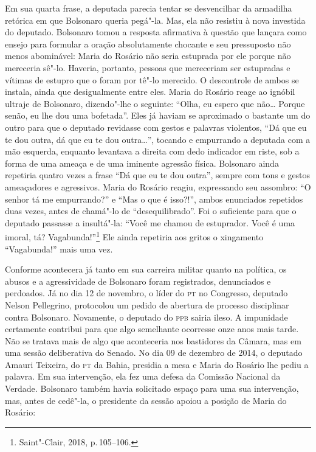 Em sua quarta frase, a deputada parecia tentar se desvencilhar da
armadilha retórica em que Bolsonaro queria pegá"-la. Mas, ela não
resistiu à nova investida do deputado. Bolsonaro tomou a resposta
afirmativa à questão que lançara como ensejo para formular a oração
absolutamente chocante e seu pressuposto não menos abominável: Maria do
Rosário não seria estuprada por ele porque não mereceria sê"-lo. Haveria,
portanto, pessoas que mereceriam ser estupradas e vítimas de estupro que
o foram por tê"-lo merecido. O descontrole de ambos se instala, ainda que
desigualmente entre eles. Maria do Rosário reage ao ignóbil ultraje de
Bolsonaro, dizendo"-lhe o seguinte: ``Olha, eu espero que não\ldots{} Porque
senão, eu lhe dou uma bofetada''. Eles já haviam se aproximado o
bastante um do outro para que o deputado revidasse com gestos e palavras
violentos, ``Dá que eu te dou outra, dá que eu te dou outra\ldots{}'',
tocando e empurrando a deputada com a mão esquerda, enquanto levantava a
direita com dedo indicador em riste, sob a forma de uma ameaça e de uma
iminente agressão física. Bolsonaro ainda repetiria quatro vezes a frase
``Dá que eu te dou outra'', sempre com tons e gestos ameaçadores e
agressivos. Maria do Rosário reagiu, expressando seu assombro: ``O
senhor tá me empurrando?'' e ``Mas o que é isso?!'', ambos enunciados
repetidos duas vezes, antes de chamá"-lo de ``desequilibrado''. Foi o
suficiente para que o deputado passasse a insultá"-la: ``Você me chamou
de estuprador. Você é uma imoral, tá? Vagabunda!''\footnote{Saint"-Clair,
  2018, p.\,105--106.} Ele ainda repetiria aos gritos o xingamento
``Vagabunda!'' mais uma vez.

Conforme acontecera já tanto em sua carreira militar quanto na política,
os abusos e a agressividade de Bolsonaro foram registrados, denunciados
e perdoados. Já no dia 12 de novembro, o líder do \textsc{pt} no Congresso,
deputado Nelson Pellegrino, protocolou um pedido de abertura de processo
disciplinar contra Bolsonaro. Novamente, o deputado do \textsc{ppb} sairia ileso.
A impunidade certamente contribui para que algo semelhante ocorresse
onze anos mais tarde. Não se tratava mais de algo que aconteceria nos
bastidores da Câmara, mas em uma sessão deliberativa do Senado. No dia
09 de dezembro de 2014, o deputado Amauri Teixeira, do \textsc{pt} da Bahia,
presidia a mesa e Maria do Rosário lhe pediu a palavra. Em sua
intervenção, ela fez uma defesa da Comissão Nacional da Verdade.
Bolsonaro também havia solicitado espaço para uma sua intervenção, mas,
antes de cedê"-la, o presidente da sessão apoiou a posição de Maria do
Rosário:

